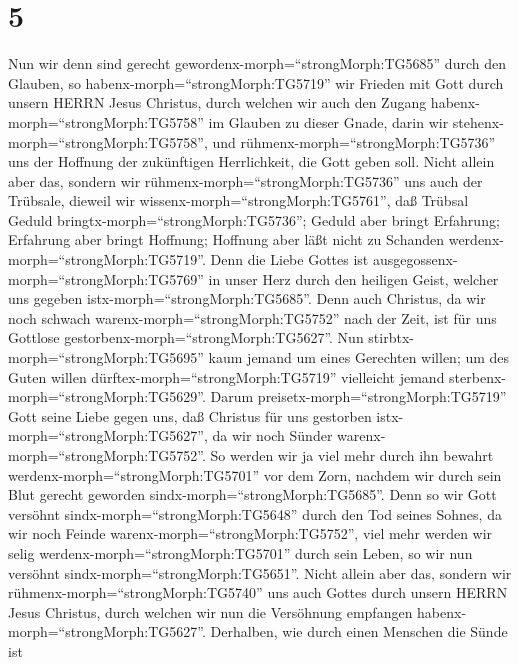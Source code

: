 \hypertarget{section-4}{%
\section{5}\label{section-4}}

 Nun wir denn sind gerecht
gewordenx-morph=``strongMorph:TG5685'' durch den Glauben, so
habenx-morph=``strongMorph:TG5719'' wir Frieden mit Gott durch unsern
HERRN Jesus Christus,  durch welchen wir auch den Zugang
habenx-morph=``strongMorph:TG5758'' im Glauben zu dieser Gnade, darin
wir stehenx-morph=``strongMorph:TG5758'', und
rühmenx-morph=``strongMorph:TG5736'' uns der Hoffnung der zukünftigen
Herrlichkeit, die Gott geben soll.  Nicht allein aber das,
sondern wir rühmenx-morph=``strongMorph:TG5736'' uns auch der Trübsale,
dieweil wir wissenx-morph=``strongMorph:TG5761'', daß Trübsal Geduld
bringtx-morph=``strongMorph:TG5736'';  Geduld aber bringt
Erfahrung; Erfahrung aber bringt Hoffnung;  Hoffnung aber
läßt nicht zu Schanden werdenx-morph=``strongMorph:TG5719''. Denn die
Liebe Gottes ist ausgegossenx-morph=``strongMorph:TG5769'' in unser Herz
durch den heiligen Geist, welcher uns gegeben
istx-morph=``strongMorph:TG5685''.  Denn auch Christus, da
wir noch schwach warenx-morph=``strongMorph:TG5752'' nach der Zeit, ist
für uns Gottlose gestorbenx-morph=``strongMorph:TG5627''. 
Nun stirbtx-morph=``strongMorph:TG5695'' kaum jemand um eines Gerechten
willen; um des Guten willen dürftex-morph=``strongMorph:TG5719''
vielleicht jemand sterbenx-morph=``strongMorph:TG5629''. 
Darum preisetx-morph=``strongMorph:TG5719'' Gott seine Liebe gegen uns,
daß Christus für uns gestorben istx-morph=``strongMorph:TG5627'', da wir
noch Sünder warenx-morph=``strongMorph:TG5752''.  So werden
wir ja viel mehr durch ihn bewahrt werdenx-morph=``strongMorph:TG5701''
vor dem Zorn, nachdem wir durch sein Blut gerecht geworden
sindx-morph=``strongMorph:TG5685''.  Denn so wir Gott
versöhnt sindx-morph=``strongMorph:TG5648'' durch den Tod seines Sohnes,
da wir noch Feinde warenx-morph=``strongMorph:TG5752'', viel mehr werden
wir selig werdenx-morph=``strongMorph:TG5701'' durch sein Leben, so wir
nun versöhnt sindx-morph=``strongMorph:TG5651''.  Nicht
allein aber das, sondern wir rühmenx-morph=``strongMorph:TG5740'' uns
auch Gottes durch unsern HERRN Jesus Christus, durch welchen wir nun die
Versöhnung empfangen habenx-morph=``strongMorph:TG5627''. 
Derhalben, wie durch einen Menschen die Sünde ist
